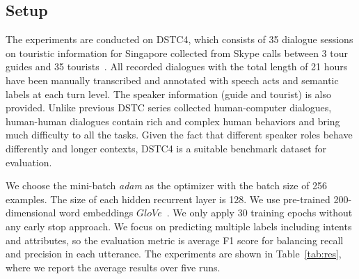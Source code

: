 \documentclass{article}
\begin{document}
\subsection{Setup}
\label{ssec:settings}
The experiments are conducted on DSTC4, which consists of 35 dialogue sessions on touristic information for Singapore collected from Skype calls between 3 tour guides and 35 tourists~\cite{kim2016fourth}. 
All recorded dialogues with the total length of 21 hours have been manually transcribed and annotated with speech acts and semantic labels at each turn level.
The speaker information (guide and tourist) is also provided.
Unlike previous DSTC series collected human-computer dialogues, 
human-human dialogues contain rich and complex human behaviors and bring much difficulty to all the tasks.
Given the fact that different speaker roles behave differently and longer contexts, DSTC4 is a suitable benchmark dataset for evaluation.

We choose the mini-batch \textit{adam} as the optimizer with the batch size of 256 examples.
The size of each hidden recurrent layer is 128.
We use pre-trained 200-dimensional word embeddings $GloVe$~\cite{pennington2014glove}.
We only apply 30 training epochs without any early stop approach. 
We focus on predicting multiple labels including intents and attributes, so the evaluation metric is average F1 score for balancing recall and precision in each utterance.
The experiments are shown in Table~\ref{tab:res}, where we report the average results over five runs. %
\end{document}
